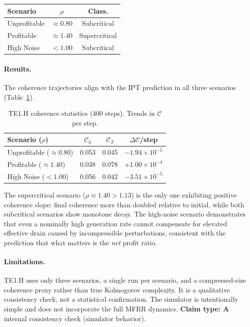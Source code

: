 \documentclass[11pt,twocolumn]{article}
\newcommand{\CatA}{\textbf{A}}
\theoremstyle{remark}
\begin{document}
\begin{center}
\begin{tabular}{@{}lcc@{}}
\toprule
Scenario & $\rho$ & Class. \\
\midrule
Unprofitable & $\approx 0.80$ & Subcritical \\
Profitable   & $\approx 1.40$ & Supercritical \\
High Noise   & $< 1.00$       & Subcritical \\
\bottomrule
\end{tabular}
\end{center}

\paragraph{Results.}
The coherence trajectories align with the IPT prediction in all three
scenarios (Table~\ref{tab:te1h}).

\begin{table}[ht]
\centering
\caption{TE1.H coherence statistics (400 steps). Trends in $\mathcal{C}$
per step.}
\label{tab:te1h}
\begin{tabular}{@{}lccc@{}}
\toprule
Scenario ($\rho$) & $\mathcal{C}_0$ & $\mathcal{C}_T$ & $\Delta\mathcal{C}$/step \\
\midrule
Unprofitable (${\approx}0.80$) & 0.053 & 0.045 & $-1.94\!\times\!10^{-5}$ \\
Profitable (${\approx}1.40$)   & 0.038 & 0.078 & $+1.00\!\times\!10^{-4}$ \\
High Noise ($<1.00$)           & 0.056 & 0.042 & $-3.51\!\times\!10^{-5}$ \\
\bottomrule
\end{tabular}
\end{table}

The supercritical scenario ($\rho \approx 1.40 > 1.13$) is the only
one exhibiting positive coherence slope: final coherence more than
doubled relative to initial, while both subcritical scenarios show
monotone decay. The high-noise scenario demonstrates that even a
nominally high generation rate cannot compensate for elevated effective
drain caused by incompressible perturbations, consistent with the
prediction that what matters is the \emph{net} profit ratio.

\paragraph{Limitations.}
TE1.H uses only three scenarios, a single run per scenario, and a
compressed-size coherence proxy rather than true Kolmogorov complexity.
It is a qualitative consistency check, not a statistical confirmation.
The simulator is intentionally simple and does not incorporate the full
MFRR dynamics. \textbf{Claim type: $\CatA$} internal consistency check (simulator behavior).
\end{document}
